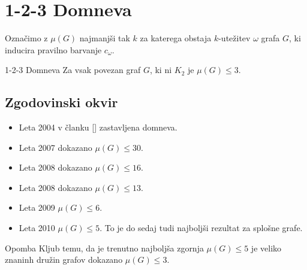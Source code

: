 \documentclass{beamer}
\begin{document}
\section{1-2-3 Domneva}
\begin{frame}
\begin{block}{}
	Označimo z $\mu(G)$ najmanjši tak $k$ za katerega obstaja $k$-utežitev $\omega$ grafa $G$, ki inducira pravilno barvanje $c_{\omega}$.
\end{block}
\begin{block}{1-2-3 Domneva}
	Za vsak povezan graf $G$, ki ni $K_2$ je $\mu(G) \le 3$.
\end{block}
\end{frame}

\subsection{Zgodovinski okvir}
\begin{frame}
\begin{itemize}
	\item Leta 2004 v članku [] zastavljena domneva.
	\item Leta 2007 dokazano $\mu(G) \le 30$.
	\item Leta 2008 dokazano $\mu(G) \le 16$.
	\item Leta 2008 dokazano $\mu(G) \le 13$.
	\item Leta 2009 $\mu(G) \le 6$.
	\item Leta 2010 $\mu(G) \le 5$. To je do sedaj tudi najboljši rezultat za splošne grafe.
\end{itemize}

\begin{block}{Opomba}
	Kljub temu, da je trenutno najboljša zgornja $\mu(G) \le 5$ je veliko znaninh družin grafov dokazano $\mu(G) \le 3$.
\end{block}
\end{frame}
\end{document}

